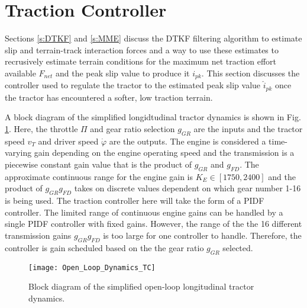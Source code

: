 \section{Traction Controller}\label{s:TC}
Sections \ref{s:DTKF} and \ref{s:MME} discuss the DTKF filtering algorithm to estimate slip and terrain-track interaction forces and a way to use these estimates to recrusively estimate terrain conditions for the maximum net traction effort available $F_{net}$ and the peak slip value to produce it $i_{pk}$. This section discusses the controller used to regulate the tractor to the estimated peak slip value $\hat{i}_{pk}$ once the tractor has encountered a softer, low traction terrain. 

A block diagram of the simplified longidtudinal tractor dynamics is shown in Fig. \ref{fig:Open_Loop_Dynamics_TC}. Here, the throttle $\Pi$ and gear ratio selection $g_{GR}$ are the inputs and the tractor speed $v_T$ and driver speed $\dot\varphi$ are the outputs. The engine is considered a time-varying gain depending on the engine operating speed and the transmission is a piecewise constant gain value that is the product of $g_{GR}$ and $g_{FD}$. The approximate continuous range for the engine gain is $K_E \in [1750,2400]$ and the product of $g_{GR}g_{FD}$ takes on discrete values dependent on which gear number 1-16 is being used. The traction controller here will take the form of a PIDF controller. The limited range of continuous engine gains can be handled by a single PIDF controller with fixed gains. However, the range of the the 16 different transmission gains $g_{GR}g_{FD}$ is too large for one controller to handle. Therefore, the controller is gain scheduled based on the the gear ratio $g_{GR}$ selected.
\begin{figure}[b]
    \centering
    \texttt{[image: Open\_Loop\_Dynamics\_TC]}
    \caption{Block diagram of the simplified open-loop longitudinal tractor dynamics.}
    \label{fig:Open_Loop_Dynamics_TC}
\end{figure}

